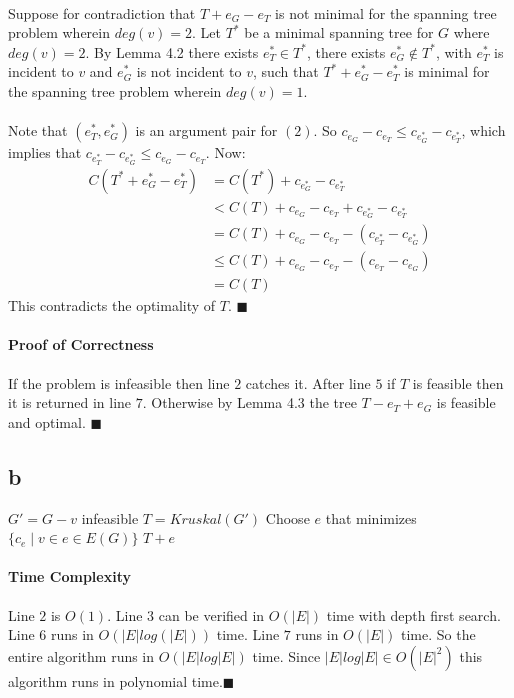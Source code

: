 \documentclass[letterpaper,12pt,oneside,onecolumn]{report}
\begin{document}
\paragraph{}
Suppose for contradiction that $T + e_G - e_T$ is not minimal for the spanning tree problem wherein $deg(v)=2$. Let $T^*$ be a minimal spanning tree for $G$ where $deg(v) = 2$. By Lemma 4.2 there exists $e^*_T \in T^*$, there exists $e^*_G \not\in T^*$, with $e^*_T$ is incident to $v$ and $e^*_G$ is not incident to $v$, such that  $T^* + e^*_G - e^*_T$ is minimal for the spanning tree problem wherein $deg(v) = 1$.
\paragraph{}
Note that $(e^*_T, e^*_G)$ is an argument pair for $(2)$. So $c_{e_G} - c_{e_T} \leq c_{e^*_G} - c_{e^*_T}$, which implies that $c_{e^*_T} - c_{e^*_G} \leq c_{e_G} - c_{e_T}$. Now:
\begin{align*}
C(T^* + e^*_G - e^*_T) &= C(T^*) + c_{e^*_G} - c_{e^*_T}\\
&< C(T) + c_{e_G} - c_{e_T} + c_{e^*_G} - c_{e^*_T}\\
&= C(T) +c_{e_G} - c_{e_T} - (c_{e^*_T} - c_{e^*_G})\\
&\leq C(T) + c_{e_G} - c_{e_T} - (c_{e_T} - c_{e_G})\\
&= C(T)  
\end{align*}
This contradicts the optimality of $T$. $\blacksquare$
\paragraph{Proof of Correctness}
If the problem is infeasible then line $2$ catches it. After line $5$ if $T$ is feasible then it is returned in line $7$. Otherwise by Lemma 4.3 the tree $T - e_T + e_G$ is feasible and optimal. $\blacksquare$
\subsection*{b}
\begin{algorithm} \begin{algorithmic}[1]
\Procedure{}{}
\State $G' = G - v$
\State \Return infeasible
\Else
\State $T = Kruskal(G')$
\State Choose $e$ that minimizes $\{ c_e \mid v \in e \in E(G) \}$
\State \Return $T + e$
\EndIf
\EndProcedure
\end{algorithmic} \end{algorithm}
\paragraph{Time Complexity}
Line $2$ is $O(1)$. Line $3$ can be verified in $O(|E|)$ time with depth first search. Line $6$ runs in $O(|E|log(|E|))$ time. Line $7$ runs in $O(|E|)$ time. So the entire algorithm runs in $O(|E|log|E|)$ time. Since $|E|log|E| \in O(|E|^2)$  this algorithm runs in polynomial time.$\blacksquare$
\end{document}
